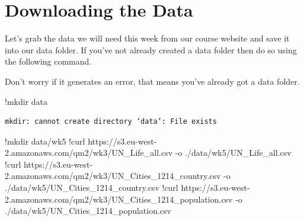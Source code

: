 \documentclass[
  letterpaper,
  DIV=11,
  numbers=noendperiod]{scrreprt}
\newenvironment{Shaded}{\begin{snugshade}}{\end{snugshade}}
\newcommand{\ErrorTok}[1]{\textcolor[rgb]{0.68,0.00,0.00}{#1}}
\newcommand{\FloatTok}[1]{\textcolor[rgb]{0.68,0.00,0.00}{#1}}
\newcommand{\NormalTok}[1]{\textcolor[rgb]{0.00,0.23,0.31}{#1}}
\newcommand{\OperatorTok}[1]{\textcolor[rgb]{0.37,0.37,0.37}{#1}}
\begin{document}
\hypertarget{downloading-the-data-2}{%
\section{Downloading the Data}\label{downloading-the-data-2}}

Let's grab the data we will need this week from our course website and
save it into our data folder. If you've not already created a data
folder then do so using the following command.

Don't worry if it generates an error, that means you've already got a
data folder.

\begin{Shaded}
\begin{Highlighting}[]
\OperatorTok{!}\NormalTok{mkdir data}
\end{Highlighting}
\end{Shaded}

\begin{verbatim}
mkdir: cannot create directory ‘data’: File exists
\end{verbatim}

\begin{Shaded}
\begin{Highlighting}[]
\OperatorTok{!}\NormalTok{mkdir data}\OperatorTok{/}\NormalTok{wk5}
\OperatorTok{!}\NormalTok{curl https:}\OperatorTok{//}\NormalTok{s3.eu}\OperatorTok{{-}}\NormalTok{west}\OperatorTok{{-}}\FloatTok{2.}\ErrorTok{amazonaws}\NormalTok{.com}\OperatorTok{/}\NormalTok{qm2}\OperatorTok{/}\NormalTok{wk3}\OperatorTok{/}\NormalTok{UN\_Life\_all.csv }\OperatorTok{{-}}\NormalTok{o .}\OperatorTok{/}\NormalTok{data}\OperatorTok{/}\NormalTok{wk5}\OperatorTok{/}\NormalTok{UN\_Life\_all.csv}
\OperatorTok{!}\NormalTok{curl https:}\OperatorTok{//}\NormalTok{s3.eu}\OperatorTok{{-}}\NormalTok{west}\OperatorTok{{-}}\FloatTok{2.}\ErrorTok{amazonaws}\NormalTok{.com}\OperatorTok{/}\NormalTok{qm2}\OperatorTok{/}\NormalTok{wk3}\OperatorTok{/}\NormalTok{UN\_Cities\_1214\_country.csv }\OperatorTok{{-}}\NormalTok{o .}\OperatorTok{/}\NormalTok{data}\OperatorTok{/}\NormalTok{wk5}\OperatorTok{/}\NormalTok{UN\_Cities\_1214\_country.csv}
\OperatorTok{!}\NormalTok{curl https:}\OperatorTok{//}\NormalTok{s3.eu}\OperatorTok{{-}}\NormalTok{west}\OperatorTok{{-}}\FloatTok{2.}\ErrorTok{amazonaws}\NormalTok{.com}\OperatorTok{/}\NormalTok{qm2}\OperatorTok{/}\NormalTok{wk3}\OperatorTok{/}\NormalTok{UN\_Cities\_1214\_population.csv }\OperatorTok{{-}}\NormalTok{o .}\OperatorTok{/}\NormalTok{data}\OperatorTok{/}\NormalTok{wk5}\OperatorTok{/}\NormalTok{UN\_Cities\_1214\_population.csv}
\end{Highlighting}
\end{Shaded}
\end{document}
